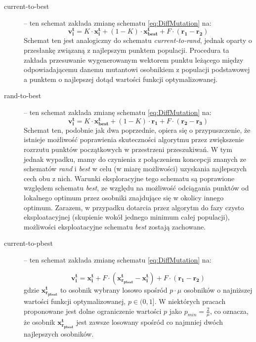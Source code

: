 \documentclass[12pt,a4paper]{report}
\begin{document}
{{{{\begin{description}
\item[current-to-best] \cite{PracticalInsights} -- ten schemat zakłada zmianę schematu \ref{eq:DiffMutation} na:
\begin{equation}
\mathbf{v_i^{t}} = K \cdot \mathbf{x_i^t} + (1 - K) \cdot \mathbf{x_{best}^t} + F \cdot (\mathbf{r_{1}} - \mathbf{r_{2}})
\end{equation}
Schemat ten jest analogiczny do schematu \emph{current-to-rand}, jednak oparty o przesłankę związaną z najlepszym punktem populacji. Procedura ta zakłada przesuwanie wygenerowanym wektorem punktu leżącego między odpowiadającemu danemu mutantowi osobnikiem z populacji podstawowej a punktem o najlepszej dotąd wartości funkcji optymalizowanej.


\item[rand-to-best] \cite{PracticalInsights} -- ten schemat zakłada zmianę schematu \ref{eq:DiffMutation} na:
\begin{equation}
\mathbf{v_i^{t}} = K \cdot \mathbf{x_{best}^t} + (1 - K) \cdot \mathbf{r_1} + F \cdot (\mathbf{r_{2}} - \mathbf{r_{3}})
\end{equation}
Schemat ten, podobnie jak dwa poprzednie, opiera się o przypuszczenie, że istnieje możliwość poprawienia skuteczności algorytmu przez zwiększenie rozrzutu punktów początkowych w przestrzeni przeszukiwań. W tym jednak wypadku, mamy do czynienia z połączeniem koncepcji znanych ze schematów \emph{rand} i \emph{best} w celu (w miarę możliwości) uzyskania najlepszych cech obu z nich. Warunki eksploracyjne tego schematu są poprawione względem schematu \emph{best}, ze względu na możliwość odciągania punktów od lokalnego optimum przez osobniki znajdujące się w okolicy innego optimum. Zarazem, w przypadku dotarcia przez algorytm do fazy czysto eksploatacyjnej (skupienie wokół jednego minimum całej populacji), możliwości eksploatacyjne schematu \emph{best} zostają zachowane.

\item[current-to-pbest] \cite{JADE} -- ten schemat zakłada zmianę schematu \ref{eq:DiffMutation} na:

\begin{equation}
\mathbf{v_i^{t}} = \mathbf{x_i^t} + F \cdot (\mathbf{x_{r_{pbest}}^t} - \mathbf{x_i^t}) + F \cdot (\mathbf{r_1} - \mathbf{r_{2}})
\end{equation}
gdzie $\mathbf{x_{r_{pbest}}^t}$ to osobnik wybrany losowo spośród $p \cdot \mu$ osobników o najniższej wartości funkcji optymalizowanej, $p \in (0,1]$. W niektórych pracach \cite{SHADE} proponowane jest dolne ograniczenie wartości $p$ jako $p_{min} = \frac{2}{\mu}$, co oznacza, że osobnik $\mathbf{x_{r_{pbest}}^t}$ jest zawsze losowany spośród co najmniej dwóch najlepszych osobników.


\end{description}}}}}
\end{document}
